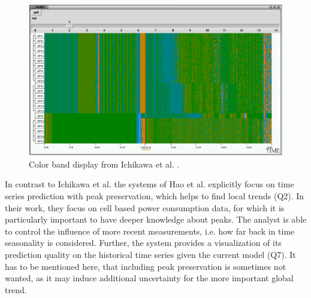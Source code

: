 \documentclass[electronic]{vgtc}             %
\begin{document}
\begin{figure}[!b]
	\centering
	\includegraphics[width=\columnwidth]{color-band}
	\caption{Color band display from Ichikawa et al. \cite{ichikawa:2002}.}
	\label{fig:color-band}
\end{figure}

In contrast to Ichikawa et al.\cite{ichikawa:2002} the systems of Hao et al. \cite{Hao:2011, Hao:2009} explicitly focus on time series prediction with peak preservation, which helps to find local trends (Q2).
In their work, they focus on cell based power consumption data, for which it is particularly important to have deeper knowledge about peaks.
The analyst is able to control the influence of more recent measurements, i.e. how far back in time seasonality is considered. 
Further, the system provides a visualization of its prediction quality on the historical time series given the current model (Q7). 
It has to be mentioned here, that including peak preservation is sometimes not wanted, as it may induce additional uncertainty for the more important global trend.
\end{document}
